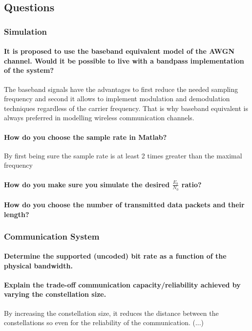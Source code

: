 \subsection{Questions}
\subsubsection{Simulation}
\paragraph{It is proposed to use the baseband equivalent model of the AWGN channel. Would it be
possible to live with a bandpass implementation of the system?}
The baseband signals have the advantages to first reduce the needed sampling frequency and second it allows to implement modulation and demodulation techniques regardless of the carrier frequency. That is why baseband equivalent is always preferred in modelling wireless communication channels.
\paragraph{How do you choose the sample rate in Matlab?} By first being sure the sample rate is at least 2 times greater than the maximal frequency 
\paragraph{How do you make sure you simulate the desired $\frac{E_b}{N_0}$ ratio?}
\paragraph{How do you choose the number of transmitted data packets and their length?}

\subsubsection{Communication System}
\paragraph{Determine the supported (uncoded) bit rate as a function of the physical bandwidth.}
\paragraph{Explain the trade-off communication capacity/reliability achieved by varying the constellation size.} 
By increasing the constellation size, it reduces the distance between the constellations so even for the reliability of the communication. (...)
